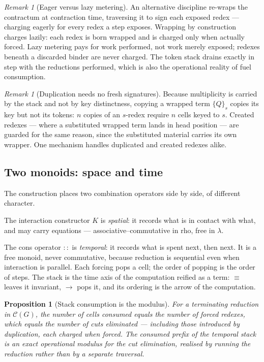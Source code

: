 \documentclass[11pt]{article}
\theoremstyle{definition}
\theoremstyle{plain}
\newtheorem{proposition}[definition]{Proposition}
\theoremstyle{remark}
\newtheorem{remark}[definition]{Remark}
\newcommand{\cost}{\mathcal{C}}
\begin{document}
\begin{remark}[Eager versus lazy metering]
An alternative discipline re-wraps the contractum at contraction time, traversing it to
sign each exposed redex --- charging eagerly for every redex a step exposes. Wrapping by
construction charges lazily: each redex is born wrapped and is charged only when actually
forced. Lazy metering pays for work performed, not work merely exposed; redexes beneath a
discarded binder are never charged. The token stack drains exactly in step with the
reductions performed, which is also the operational reality of fuel consumption.
\end{remark}

\begin{remark}[Duplication needs no fresh signatures]
Because multiplicity is carried by the stack and not by key distinctness, copying a
wrapped term $\{Q\}_s$ copies its key but not its tokens: $n$ copies of an $s$-redex
require $n$ cells keyed to $s$. Created redexes --- where a substituted wrapped term
lands in head position --- are guarded for the same reason, since the substituted
material carries its own wrapper. One mechanism handles duplicated and created redexes
alike.
\end{remark}

\subsection{Two monoids: space and time}

The construction places two combination operators side by side, of different character.

The interaction constructor $K$ is \emph{spatial}: it records what is in contact with
what, and may carry equations --- associative--commutative in rho, free in $\lambda$.

The cons operator $::$ is \emph{temporal}: it records what is spent next, then next. It
is a free monoid, never commutative, because reduction is sequential even when
interaction is parallel. Each forcing pops a cell; the order of popping is the order of
steps. The stack is the time axis of the computation reified as a term: $\equiv$ leaves
it invariant, $\longrightarrow$ pops it, and its ordering is the arrow of the computation.

\begin{proposition}[Stack consumption is the modulus]
For a terminating reduction in $\cost(G)$, the number of cells consumed equals the number
of forced redexes, which equals the number of cuts eliminated --- including those
introduced by duplication, each charged when forced. The consumed prefix of the temporal
stack is an exact operational modulus for the cut elimination, realised by running the
reduction rather than by a separate traversal.
\end{proposition}
\end{document}
